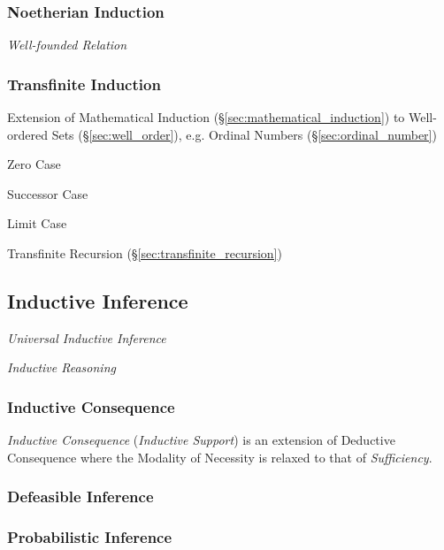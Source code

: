 \subsubsection{Noetherian Induction}\label{sec:noetherian_induction}

\emph{Well-founded Relation}



\subsubsection{Transfinite Induction}\label{sec:transfinite_induction}

Extension of Mathematical Induction
(\S\ref{sec:mathematical_induction}) to Well-ordered Sets
(\S\ref{sec:well_order}), e.g. Ordinal Numbers
(\S\ref{sec:ordinal_number})

Zero Case

Successor Case

Limit Case

Transfinite Recursion (\S\ref{sec:transfinite_recursion})



\subsection{Inductive Inference}\label{sec:inductive_inference}
\cite{hawthorne08}

\emph{Universal Inductive Inference}

\emph{Inductive Reasoning}



\subsubsection{Inductive Consequence}\label{sec:inductive_consequence}

\emph{Inductive Consequence} (\emph{Inductive Support}) is an
extension of Deductive Consequence where the Modality of Necessity is
relaxed to that of \emph{Sufficiency}.



\subsubsection{Defeasible Inference}\label{sec:defeasible_inference}

\subsubsection{Probabilistic Inference}\label{sec:probabilistic_inference}

